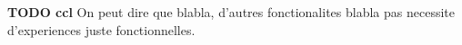 {\color{red} \textbf{TODO ccl}}
On peut dire que blabla, d'autres fonctionalites blabla pas necessite d'experiences juste fonctionnelles.

